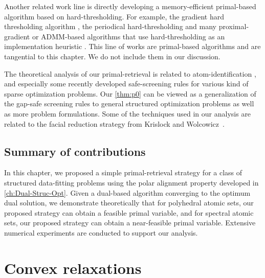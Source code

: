 Another related work line is directly developing a memory-efficient primal-based algorithm based on hard-thresholding. For example, the gradient hard thresholding algorithm \cite{YuanLZ17}, the periodical hard-thresholding \cite{Allen-ZhuHHL17} and many proximal-gradient or ADMM-based algorithms that use hard-thresholding as an implementation heuristic \cite{mazumder2010spectral,Lin11,hsieh2014nuclear}. This line of works are primal-based algorithms and are tangential to this chapter. We do not include them in our discussion. 

The theoretical analysis of our primal-retrieval is related to atom-identification \cite{BurM88,hare2004identifying,hare2011identifying}, and especially some recently developed safe-screening rules \cite{Ghaoui12,wang2013lasso,liu2014safe,WangZLWY14,Raj2015ScreeningRF,BonnefoyERG15,XiangWR17,NdiayeFGS17,ZhangHLYCHW17,kuang2017screening,Atamtrk2020SafeSR,Bao20} for various kind of sparse optimization problems. Our \autoref{thm:p0} can be viewed as a generalization of the gap-safe screening rules to general structured optimization problems as well as more problem formulations. Some of the techniques used in our analysis are related to the facial reduction strategy from Krislock and Wolcowicz~\cite{krislock2010explicit}. 

\subsection{Summary of contributions}

In this chapter, we proposed a simple primal-retrieval strategy for a class of structured data-fitting problems using the polar alignment property developed in \autoref{ch:Dual-Struc-Opt}. Given a dual-based algorithm converging to the optimum dual solution, we demonstrate theoretically that for polyhedral atomic sets, our proposed strategy can obtain a feasible primal variable, and for spectral atomic sets, our proposed strategy can obtain a near-feasible primal variable. Extensive numerical experiments are conducted to support our analysis. 


\section{Convex relaxations}
\label{sec:4-2}

